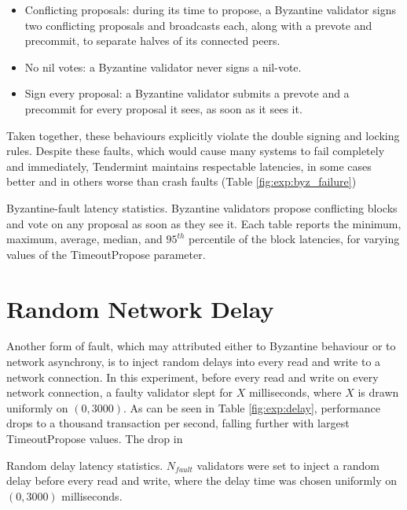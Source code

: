 \begin{itemize}
\item{Conflicting proposals: during its time to propose, a Byzantine validator signs two conflicting proposals and broadcasts each, along with a prevote and precommit, to separate halves of its connected peers.} 
\item{No nil votes: a Byzantine validator never signs a nil-vote.}
\item{Sign every proposal: a Byzantine validator submits a prevote and a precommit for every proposal it sees, as soon as it sees it.}
\end{itemize}

Taken together, these behaviours explicitly violate the double signing and locking rules. 
Despite these faults, which would cause many systems to fail completely and immediately,
Tendermint maintains respectable latencies, in some cases better and in others worse than crash faults (Table \ref{fig:exp:byz_failure})

\begin{table}[]
	
	\caption[Latency statistics under byzantine faults]{Byzantine-fault latency statistics.
Byzantine validators propose conflicting blocks and vote on any proposal as soon as they see it.
Each table reports the minimum, maximum, average, median, and $95^{th}$ percentile of the block latencies, for varying values of the TimeoutPropose parameter.}
	\label{fig:exp:byz_failure}
\end{table}

\section{Random Network Delay}

Another form of fault, which may attributed either to Byzantine behaviour or to network asynchrony,
is to inject random delays into every read and write to a network connection.
In this experiment, before every read and write on every network connection,
a faulty validator slept for $X$ milliseconds, where $X$ is drawn uniformly on $(0, 3000)$.
As can be seen in Table \ref{fig:exp:delay}, 
performance drops to a thousand transaction per second, falling further with largest TimeoutPropose values.
The drop in 

\begin{table}[]
	
	\caption[Latency statistics under randomized delays]{Random delay latency statistics. $N_{fault}$ validators were set to inject a random delay
before every read and write, where the delay time was chosen uniformly on $(0, 3000)$ milliseconds.}
	\label{fig:exp:delay}
\end{table}

